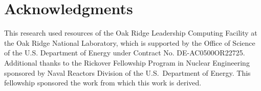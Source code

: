 \documentclass{article}                                                                           %
\begin{document}




\pagebreak
\section*{Acknowledgments}

This research used resources of the Oak Ridge Leadership Computing Facility at the Oak Ridge National Laboratory, which is supported by the Office of Science of the U.S. Department of Energy under Contract No. DE-AC0500OR22725. Additional thanks to the Rickover Fellowship Program in Nuclear Engineering sponsored by Naval Reactors Division of the U.S.\ Department of Energy. This fellowship sponsored the work from which this work is derived.

\pagebreak



\end{document}
